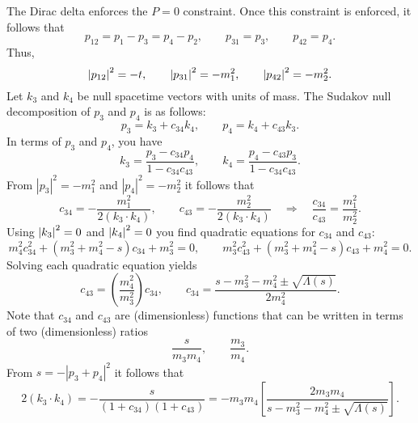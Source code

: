 The Dirac delta enforces the $P = 0$ constraint. Once this constraint is enforced, it follows that
\begin{equation}
	p_{12} = p_{1} - p_{3} = p_{4} - p_{2}, \qquad p_{31} = p_{3}, \qquad p_{42} = p_{4}.
\end{equation}
Thus,
\begin{equation}
	\left\lvert p_{12} \right\rvert^{2} = -t, \qquad \left\lvert p_{31} \right\rvert^{2} = -m_{1}^{2}, \qquad \left\lvert p_{42} \right\rvert^{2} = -m_{2}^{2}.
\end{equation}
Let $k_{3}$ and $k_{4}$ be null spacetime vectors with units of mass. The Sudakov null decomposition of $p_{3}$ and $p_{4}$ is as follows:
\begin{equation}
	p_{3} = k_{3} + c_{34} k_{4}, \qquad p_{4} = k_{4} + c_{43} k_{3}.
\end{equation}
In terms of $p_{3}$ and $p_{4}$, you have
\begin{equation}
	k_{3} = \frac{p_{3} - c_{34} p_{4}}{1 - c_{34} c_{43}}, \qquad k_{4} = \frac{p_{4} - c_{43} p_{3}}{1 - c_{34} c_{43}}.
	\label{eq:k3_and_k4}
\end{equation}
From $|p_{3}|^{2} = -m_{1}^{2}$ and $|p_{4}|^{2} = -m_{2}^{2}$ it follows that
\begin{equation}
	c_{34} = - \frac{m_{1}^{2}}{2 (k_{3} \cdot k_{4})}, \qquad c_{43} = - \frac{m_{2}^{2}}{2 (k_{3} \cdot k_{4})} \quad \Longrightarrow \quad \frac{c_{34}}{c_{43}} = \frac{m_{1}^{2}}{m_{2}^{2}}.
\end{equation}
Using $\left\lvert k_{3} \right\rvert^{2} = 0$ and $\left\lvert k_{4} \right\rvert^{2} = 0$ you find quadratic equations for $c_{34}$ and $c_{43}$:
\begin{equation}
	m_{4}^{2} c_{34}^{2} + (m_{3}^{2} + m_{4}^{2} - s) c_{34} + m_{3}^{2} = 0, \qquad m_{3}^{2} c_{43}^{2} + (m_{3}^{2} + m_{4}^{2} - s) c_{43} + m_{4}^{2} = 0.
\end{equation}
Solving each quadratic equation yields
\begin{equation}
	c_{43} = \left( \frac{m_{4}^{2}}{m_{3}^{2}} \right) c_{34}, \qquad c_{34} = \frac{s - m_{3}^{2} - m_{4}^{2} \pm \sqrt{\Lambda(s)}}{2 m_{4}^{2}}.
\end{equation}
Note that $c_{34}$ and $c_{43}$ are (dimensionless) functions that can be written in terms of two (dimensionless) ratios
\begin{equation}
	\frac{s}{m_{3} m_{4}}, \qquad \frac{m_{3}}{m_{4}}.
\end{equation}
From $s = -|p_{3} + p_{4}|^{2}$ it follows that
\begin{equation}
	2 (k_{3} \cdot k_{4}) = - \frac{s}{(1 + c_{34})(1 + c_{43})} = -m_{3} m_{4} \left[ \frac{2 m_{3} m_{4}}{s - m_{3}^{2} - m_{4}^{2} \pm \sqrt{\Lambda(s)}} \right].
\end{equation}
